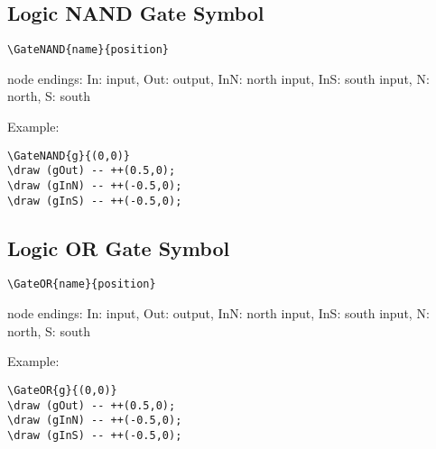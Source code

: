 \documentclass[parskip=full]{scrartcl}
\begin{document}
\subsection{Logic NAND Gate Symbol}

\begin{verbatim}
\GateNAND{name}{position}
\end{verbatim}
node endings: In: input, Out: output,
              InN: north input, InS: south input,
              N: north, S: south

Example:\\
\begin{minipage}{0.8\textwidth}
\begin{verbatim}
\GateNAND{g}{(0,0)}
\draw (gOut) -- ++(0.5,0);
\draw (gInN) -- ++(-0.5,0);
\draw (gInS) -- ++(-0.5,0);
\end{verbatim}
\end{minipage}
\begin{minipage}{0.19\textwidth}
\end{minipage}

\subsection{Logic OR Gate Symbol}

\begin{verbatim}
\GateOR{name}{position}
\end{verbatim}
node endings: In: input, Out: output,
              InN: north input, InS: south input,
              N: north, S: south

Example:\\
\begin{minipage}{0.8\textwidth}
\begin{verbatim}
\GateOR{g}{(0,0)}
\draw (gOut) -- ++(0.5,0);
\draw (gInN) -- ++(-0.5,0);
\draw (gInS) -- ++(-0.5,0);
\end{verbatim}
\end{minipage}
\begin{minipage}{0.19\textwidth}
\end{minipage}
\end{document}
